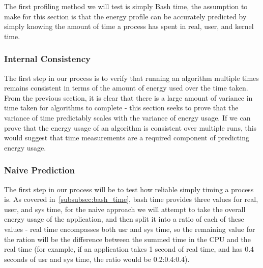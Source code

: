 The first profiling method we will test is simply Bash time, the assumption to make for this section is that the energy
profile can be accurately predicted by simply knowing the amount of time a process has spent in real, user, and kernel
time.

\subsubsection{Internal Consistency}
The first step in our process is to verify that running an algorithm multiple times remains consistent in terms of the
amount of energy used over the time taken.
From the previous section, it is clear that there is a large amount of variance in time taken for algorithms to complete
- this section seeks to prove that the variance of time predictably scales with the variance of energy usage.
If we can prove that the energy usage of an algorithm is consistent over multiple runs, this would suggest that time
measurements are a required component of predicting energy usage.

\subsubsection{Naive Prediction}
The first step in our process will be to test how reliable simply timing a process is.
As covered in~\ref{subsubsec:bash_time}, bash time provides three values for real, user, and sys time, for the naive
approach we will attempt to take the overall energy usage of the application, and then split it into a ratio of each of
these values - real time encompasses both usr and sys time, so the remaining value for the ration will be the difference
between the summed time in the CPU and the real time (for example, if an application takes 1 second of real time, and
has 0.4 seconds of usr and sys time, the ratio would be 0.2:0.4:0.4).

